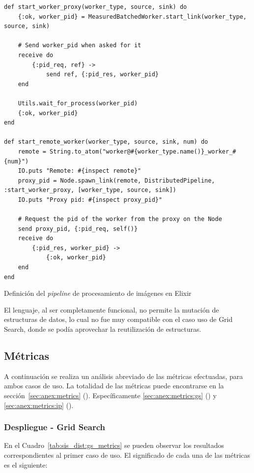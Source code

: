\documentclass[11pt]{article}
\let\Oldsubsection\subsection
\renewcommand{\subsection}{\FloatBarrier\Oldsubsection}
\let\Oldsubsubsection\subsubsection
\renewcommand{\subsubsection}{\FloatBarrier\Oldsubsubsection}
\newcommand{\english}[1]{\textit{#1}}
\begin{document}
\begin{listing}[ht]
\begin{verbatim}
def start_worker_proxy(worker_type, source, sink) do
    {:ok, worker_pid} = MeasuredBatchedWorker.start_link(worker_type, source, sink)
    
    # Send worker_pid when asked for it
    receive do
        {:pid_req, ref} ->
            send ref, {:pid_res, worker_pid}
    end
    
    Utils.wait_for_process(worker_pid)
    {:ok, worker_pid}
end

def start_remote_worker(worker_type, source, sink, num) do
    remote = String.to_atom("worker@#{worker_type.name()}_worker_#{num}")
    IO.puts "Remote: #{inspect remote}"
    proxy_pid = Node.spawn_link(remote, DistributedPipeline, :start_worker_proxy, [worker_type, source, sink])
    IO.puts "Proxy pid: #{inspect proxy_pid}"
    
    # Request the pid of the worker from the proxy on the Node
    send proxy_pid, {:pid_req, self()}
    receive do
        {:pid_res, worker_pid} ->
            {:ok, worker_pid}
    end
end
\end{verbatim}
\caption{Definición del \english{pipeline} de procesamiento de imágenes en Elixir}
\label{code:elx:start_worker}
\end{listing}

El lenguaje, al ser completamente funcional, no permite la mutación de estructuras de datos, lo cual no fue muy compatible con el caso uso de Grid Search, donde se podía aprovechar la reutilización de estructuras.

\subsection{Métricas}

A continuación se realiza un análisis abreviado de las métricas efectuadas, para ambos casos de uso.
La totalidad de las métricas puede encontrarse en la sección~\ref{sec:anex:metrics} (). Específicamente \ref{sec:anex:metrics:gs} () y \ref{sec:anex:metrics:ip} ().

\subsubsection{Despliegue - Grid Search} \label{sec:gs_metrics}

En el Cuadro~\ref{tab:sis_dist:gs_metrics} se pueden observar los resultados correspondientes al primer caso de uso. El significado de cada una de las métricas es el siguiente:
\end{document}
